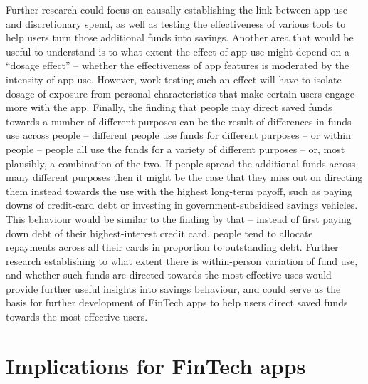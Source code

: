 Further research could focus on causally establishing the link between app use
and discretionary spend, as well as testing the effectiveness of various tools
to help users turn those additional funds into savings. Another area that would
be useful to understand is to what extent the effect of app use might depend on
a ``dosage effect'' -- whether the effectiveness of app features is moderated
by the intensity of app use. However, work testing such an effect will have to
isolate dosage of exposure from personal characteristics that make certain
users engage more with the app. Finally, the finding that people may direct
saved funds towards a number of different purposes can be the result of
differences in funds use across people -- different people use funds for
different purposes -- or within people -- people all use the funds for a
variety of different purposes -- or, most plausibly, a combination of the two.
If people spread the additional funds across many different purposes then it
might be the case that they miss out on directing them instead towards the use
with the highest long-term payoff, such as paying downs of credit-card debt or
investing in government-subsidised savings vehicles. This behaviour would be
similar to the finding by \citet{gathergood2019individuals} that -- instead of
first paying down debt of their highest-interest credit card, people tend to
allocate repayments across all their cards in proportion to outstanding debt.
Further research establishing to what extent there is within-person variation
of fund use, and whether such funds are directed towards the most effective
uses would provide further useful insights into savings behaviour, and could
serve as the basis for further development of FinTech apps to help users direct
saved funds towards the most effective users.

\section{Implications for FinTech apps}

